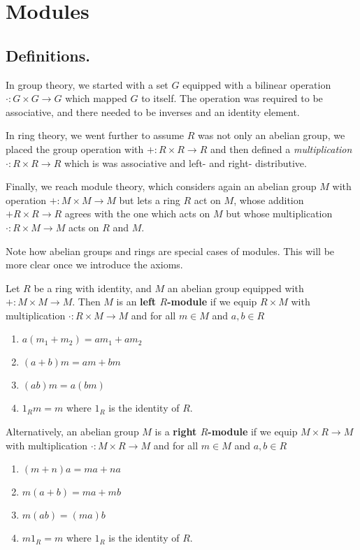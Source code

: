 \chapter{Modules}

\section{Definitions.}

In group theory, we started with a set $G$ equipped with a bilinear
operation $\cdot : G \times G \to G$ which mapped $G$ to itself.
The operation was required to be associative, and there needed to
be inverses and an identity element. 

In ring theory, we went further to assume $R$ was not only an
abelian group, we placed the group operation with $+: R\times R
\to R$ and then defined a \textit{multiplication} $\cdot: R \times
R \to R$ which is was associative and left- and right-
distributive.

Finally, we reach module theory, which considers again an abelian
group $M$ with operation $+:M \times M \to M$ but lets a ring $R$
act on $M$, whose addition $+R\times R \to R$ agrees with the one
which acts on $M$ but whose multiplication $\cdot: R \times M \to
M$ acts on $R$ and $M$. 

Note how abelian groups and rings are special cases of modules.
This will be more clear once we introduce the axioms. 

\begin{definition}
    Let $R$ be a ring with identity, and $M$ an abelian group
    equipped with $+:M \times M \to M$. Then $M$ is an
    \textbf{left $R$-module} if we equip $R \times M$ with
    multiplication $\cdot : R \times M \to M$ and for all $m \in
    M$ and $a, b \in R$
    \begin{enumerate}
        \item $a(m_1 + m_2)= am_1 + am_2$
        \item $(a + b)m = am + bm$
        \item $(ab)m = a(bm)$
        \item $1_Rm = m$ where $1_R$ is the identity of $R$.
    \end{enumerate} 

    Alternatively, an abelian group $M$ is a \textbf{right $R$-module} if we equip
    $M \times R \to M$ with multiplication $\cdot: M \times R \to
    M$ and for all $m \in M$ and $a, b \in R$
    \begin{enumerate}
        \item $(m + n)a = ma + na$ 
        \item $m(a + b) = ma + mb$
        \item $m(ab) = (ma)b$
        \item $m1_R = m$ where $1_R$ is the identity of $R$.
    \end{enumerate}
\end{definition}

